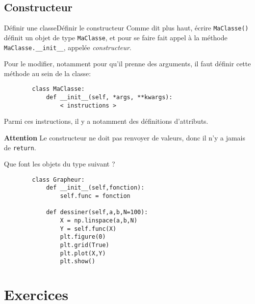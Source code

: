 \subsection{Constructeur}

\begin{frame}[fragile]{Définir une classe}{Définir le constructeur}
	Comme dit plus haut, écrire \lstinline|MaClasse()| définit un objet de type \lstinline|MaClasse|, et pour se faire fait appel à la méthode \lstinline|MaClasse.__init__|, appelée \textit{constructeur}.\pause
	
	Pour le modifier, notamment pour qu'il prenne des arguments, il faut définir cette méthode au sein de la classe:
	\begin{lstlisting}
		class MaClasse:
			def __init__(self, *args, **kwargs):
				< instructions >
	\end{lstlisting} Parmi ces instructions, il y a notamment des définitions d'attributs.\pause
	
	\textbf{Attention} Le constructeur ne doit pas renvoyer de valeurs, donc il n'y a jamais de \lstinline|return|.
\end{frame}

\begin{frame}[fragile]
	\begin{exem}
	Que font les objets du type suivant ?
	\begin{lstlisting}
		class Grapheur:
			def __init__(self,fonction):
				self.func = fonction
			
			def dessiner(self,a,b,N=100):
				X = np.linspace(a,b,N)
				Y = self.func(X)
				plt.figure(0)
				plt.grid(True)
				plt.plot(X,Y)
				plt.show()
	\end{lstlisting}
	\end{exem}
\end{frame}




\section{Exercices}

